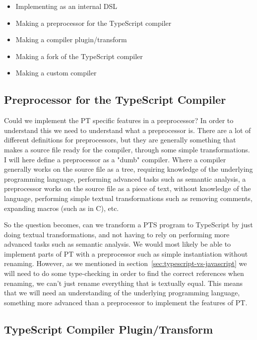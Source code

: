 \begin{itemize}
    \item Implementing as an internal DSL
    \item Making a preprocessor for the TypeScript compiler
    \item Making a compiler plugin/transform
    \item Making a fork of the TypeScript compiler
    \item Making a custom compiler
\end{itemize}



\subsection{Preprocessor for the TypeScript Compiler}\label{subsec:preprocessor-for-the-typescript-compiler}

Could we implement the PT specific features in a preprocessor?
In order to understand this we need to understand what a preprocessor is.
There are a lot of different definitions for preprocessors, but they are generally something that makes a source file ready for the compiler, through some simple transformations.
I will here define a preprocessor as a "dumb" compiler.
Where a compiler generally works on the source file as a tree, requiring knowledge of the underlying programming language, performing advanced tasks such as semantic analysis, a preprocessor works on the source file as a piece of text, without knowledge of the language, performing simple textual transformations such as removing comments, expanding macros (such as  in C), etc.

So the question becomes, can we transform a PTS program to TypeScript by just doing textual transformations, and not having to rely on performing more advanced tasks such as semantic analysis.
We would most likely be able to implement parts of PT with a preprocessor such as simple instantiation without renaming.
However, as we mentioned in section~\vref{sec:typescript-vs-javascript} we will need to do some type-checking in order to find the correct references when renaming, we can't just rename everything that is textually equal.
This means that we will need an understanding of the underlying programming language, something more advanced than a preprocessor to implement the features of PT\@.

\subsection{TypeScript Compiler Plugin/Transform}\label{subsec:typescript-compiler-plugin}

